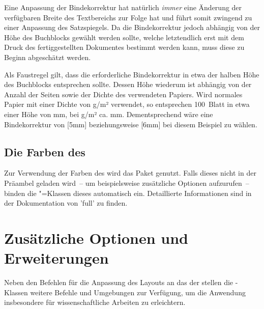 Eine Anpassung der Bindekorrektur hat natürlich \emph{immer} eine Änderung der 
verfügbaren Breite des Textbereichs zur Folge hat und führt somit zwingend zu 
einer Anpassung des Satzspiegels. Da die Bindekorrektur jedoch abhängig von der 
Höhe des Buchblocks gewählt werden sollte, welche letztendlich erst mit dem 
Druck des fertiggestellten Dokumentes bestimmt werden kann, muss diese zu 
Beginn abgeschätzt werden.
%
\begin{Example}
Als Faustregel gilt, dass die erforderliche Bindekorrektur in etwa der halben 
Höhe des Buchblocks entsprechen sollte. Dessen Höhe wiederum ist abhängig von 
der Anzahl der Seiten sowie der Dichte des verwendeten Papiers. Wird normales 
Papier mit einer Dichte von \unit[80]{g/m²} verwendet, so entsprechen 100~Blatt 
in etwa einer Höhe von \unit[10]{mm}, bei \unit[100]{g/m²} ca. \unit[12]{mm}. 
Dementsprechend wäre eine Bindekorrektur von [5mm] beziehungsweise 
[6mm] bei diesem Beispiel zu wählen.
\end{Example}
%


\subsection{Die Farben des \CDs}
%
% 
Zur Verwendung der Farben des \CDs wird das Paket  
genutzt. Falls dieses nicht in der Präambel geladen wird~-- um beispielsweise 
zusätzliche Optionen aufzurufen~-- binden die \TUDScript"=Klassen dieses 
automatisch ein. Detaillierte Informationen sind in der Dokumentation von 
'full' zu finden.



\section{Zusätzliche Optionen und Erweiterungen}
%
Neben den Befehlen für die Anpassung des Layouts an das \CD der \TnUD stellen 
die \TUDScript-Klassen weitere Befehle und Umgebungen zur Verfügung, um die 
Anwendung insbesondere für wissenschaftliche Arbeiten zu erleichtern.


